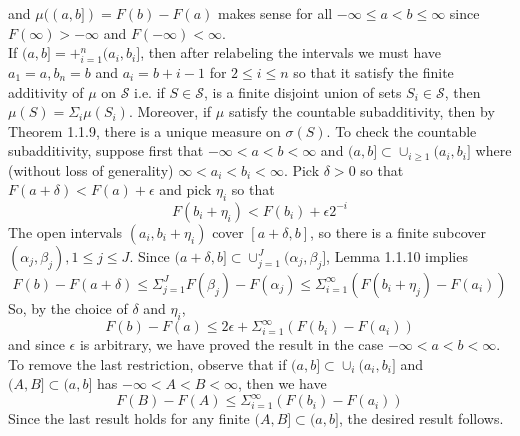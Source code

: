 \documentclass[10pt]{article}
\begin{document}
and $\mu((a,b])=F(b)-F(a)$ makes sense for all $-\infty \leq a < b \leq \infty$ since $F(\infty) > -\infty$ and $F(-\infty) < \infty$.\\
If $(a,b] = +_{i=1}^n(a_i,b_i]$, then after relabeling the intervals we must have $a_1=a, b_n=b$ and $a_i=b+{i-1}$ for $2 \leq i \leq n$ so that it satisfy the finite additivity of $\mu$ on $\mathcal{S}$ i.e. if $S \in \mathcal{S}$, is a finite disjoint union of sets $S_i \in \mathcal{S}$, then $\mu(S)=\Sigma_i \mu(S_i)$. Moreover, if $\mu$ satisfy the countable subadditivity, then by Theorem 1.1.9, there is a unique measure on $\sigma(S)$. To check the countable subadditivity, suppose first that $-\infty < a < b < \infty$ and $(a,b] \subset \cup_{i\geq1}(a_i,b_i]$ where (without loss of generality) $\infty < a_i < b_i <\infty$. Pick $\delta > 0$ so that $F(a+\delta) < F(a) + \epsilon$ and pick $\eta_i$ so that
$$F(b_i + \eta_i) < F(b_i) + \epsilon2^{-i}$$
The open intervals $(a_i, b_i + \eta_i)$ cover $[a + \delta, b]$, so there is a finite subcover $(\alpha_j, \beta_j), 1\leq j \leq J$. Since $(a+\delta, b] \subset \cup_{j=1}^J(\alpha_j, \beta_j]$, Lemma 1.1.10 implies 
$$F(b)-F(a+\delta) \leq \Sigma_{j=1}^J F(\beta_j) - F(\alpha_j) \leq \Sigma_{i=1}^\infty (F(b_i+\eta_j) - F(a_i))$$
So, by the choice of $\delta$ and $\eta_i$,
$$F(b)-F(a) \leq 2\epsilon + \Sigma_{i=1}^\infty(F(b_i) - F(a_i))$$
and since $\epsilon$ is arbitrary, we have proved the result in the case $-\infty < a <b < \infty$. To remove the last restriction, observe that if $(a,b] \subset \cup_i(a_i, b_i]$ and $(A, B] \subset (a,b]$ has $-\infty < A < B < \infty$, then we have 
$$F(B) - F(A) \leq \Sigma_{i=1}^\infty(F(b_i) - F(a_i))$$
Since the last result holds for any finite $(A,B] \subset (a,b]$, the desired result follows.
\end{document}
